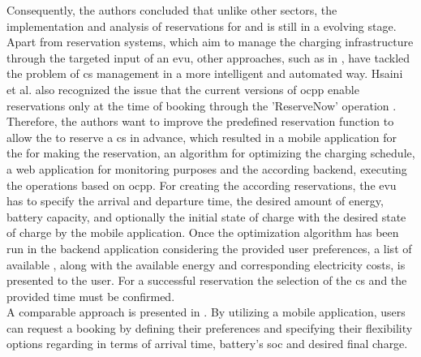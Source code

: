 Consequently, the authors concluded that unlike other sectors, the implementation and analysis of reservations for  and  is still in a evolving stage. \\
\noindent Apart from reservation systems, which aim to manage the charging infrastructure through the targeted input of an \acrshort{evu}, other approaches, such as in \cite{hsaini_ocpp-based_2022}, have tackled the problem of \acrshort{cs} management in a more intelligent and automated way.
Hsaini et al. also recognized the issue that the current versions of \acrshort{ocpp} enable reservations only at the time of booking through the 'ReserveNow' operation \cite{noauthor_ocpp_nodate,noauthor_ocpp_nodate}.
Therefore, the authors want to improve the predefined reservation function to allow the  to reserve a \acrshort{cs} in advance, which resulted in a mobile application for the  for making the reservation, an algorithm for optimizing the charging schedule, a web application for monitoring purposes and the according backend, executing the operations based on \acrshort{ocpp}.
For creating the according reservations, the \acrshort{evu} has to specify the arrival and departure time, the desired amount of energy, battery capacity, and optionally the initial state of charge with the desired state of charge by the mobile application.
Once the optimization algorithm has been run in the backend application considering the provided user preferences, a list of available , along with the available energy and corresponding electricity costs, is presented to the user. For a successful reservation the selection of the \acrshort{cs} and the provided time must be confirmed. \\
\noindent A comparable approach is presented in \cite{orcioni_ev_2020}. By utilizing a mobile application, users can request a booking by defining their preferences and specifying their flexibility options regarding in terms of arrival time, battery's \acrshort{soc} and desired final charge.
